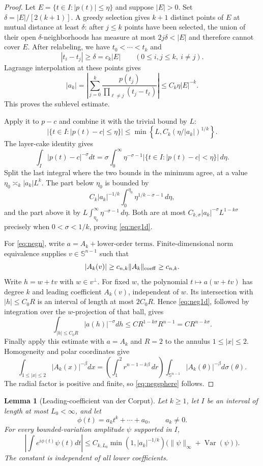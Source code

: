 \documentclass[11pt]{article}
\numberwithin{equation}{section}
\newtheorem{lemma}[theorem]{Lemma}
\theoremstyle{remark}
\theoremstyle{definition}
\newcommand{\Sph}{\mathbb S}
\newcommand{\Var}{\operatorname{Var}}
\newcommand{\norm}[1]{\lVert #1\rVert}
\begin{document}
\begin{proof}
Let $E=\{t\in I:|p(t)|\le\eta\}$ and suppose $|E|>0$.
Set $\delta=|E|/[2(k+1)]$.  A greedy selection gives $k+1$ distinct
points of $E$ at mutual distance at least $\delta$: after $j\le k$
points have been selected, the union of their open $\delta$-neighborhoods
has measure at most $2j\delta<|E|$ and therefore cannot cover $E$.
After relabeling, we have $t_0<\cdots<t_k$ and
\[
 |t_i-t_j|\ge\delta=c_k|E|
 \qquad(0\le i,j\le k,\ i\ne j).
\]
Lagrange interpolation at these points gives
\[
 |a_k|
 =\left|\sum_{j=0}^k
   \frac{p(t_j)}{\prod_{\ell\ne j}(t_j-t_\ell)}\right|
 \le C_k\eta |E|^{-k}.
\]
This proves the sublevel estimate.

Apply it to $p-c$ and combine it with the trivial bound by $L$:
\[
 |\{t\in I:|p(t)-c|\le\eta\}|
 \le\min\left\{L,C_k(\eta/|a_k|)^{1/k}\right\}.
\]
The layer-cake identity gives
\[
 \int_I|p(t)-c|^{-\sigma}dt
 =\sigma\int_0^\infty
  \eta^{-\sigma-1}
  |\{t\in I:|p(t)-c|<\eta\}|\,d\eta.
\]
Split the last integral where the two bounds in the minimum agree,
at a value $\eta_0\asymp_k |a_k|L^k$.  The part below $\eta_0$ is
bounded by
\[
 C_k|a_k|^{-1/k}
 \int_0^{\eta_0}\eta^{1/k-\sigma-1}\,d\eta,
\]
and the part above it by
$L\int_{\eta_0}^{\infty}\eta^{-\sigma-1}\,d\eta$.
Both are at most
$C_{k,\sigma}|a_k|^{-\sigma}L^{1-k\sigma}$ precisely when
$0<\sigma<1/k$, proving \eqref{eq:neg1d}.

For \eqref{eq:negn}, write $a=A_k+\text{lower-order terms}$.
Finite-dimensional norm equivalence supplies
$v\in\Sph^{n-1}$ such that
\[
 |A_k(v)|\ge c_{n,k}\norm{A_k}_{\rm coeff}\ge c_{n,k}.
\]
Write $h=w+tv$ with $w\in v^\perp$.  For fixed $w$, the polynomial
$t\mapsto a(w+tv)$ has degree $k$ and leading coefficient $A_k(v)$,
independent of $w$.  Its intersection with $|h|\le C_0R$ is an interval
of length at most $2C_0R$.  Hence \eqref{eq:neg1d}, followed by integration
over the $w$-projection of that ball, gives
\[
 \int_{|h|\le C_0R}|a(h)|^{-\sigma}dh
 \le C R^{1-k\sigma}R^{n-1}
 =C R^{n-k\sigma}.
\]
Finally apply this estimate with $a=A_k$ and $R=2$ to the annulus
$1\le|x|\le2$.  Homogeneity and polar coordinates give
\[
 \int_{1\le|x|\le2}|A_k(x)|^{-\beta}dx
 =\left(\int_1^2r^{n-1-k\beta}\,dr\right)
   \int_{\Sph^{n-1}}|A_k(\theta)|^{-\beta}d\sigma(\theta).
\]
The radial factor is positive and finite, so \eqref{eq:negsphere} follows.
\end{proof}

\begin{lemma}[Leading-coefficient van der Corput]\label{lem:vdc}
Let $k\ge1$, let $I$ be an interval of length at most $L_0<\infty$, and
let
\[
 \phi(t)=a_kt^k+\cdots+a_0,\qquad a_k\ne0.
\]
For every bounded-variation amplitude $\psi$ supported in $I$,
\[
 \left|\int e^{i\phi(t)}\psi(t)dt\right|
 \le C_{k,L_0}\min(1,|a_k|^{-1/k})
 \bigl(\norm\psi_\infty+\Var(\psi)\bigr).
\]
The constant is independent of all lower coefficients.
\end{lemma}
\end{document}
